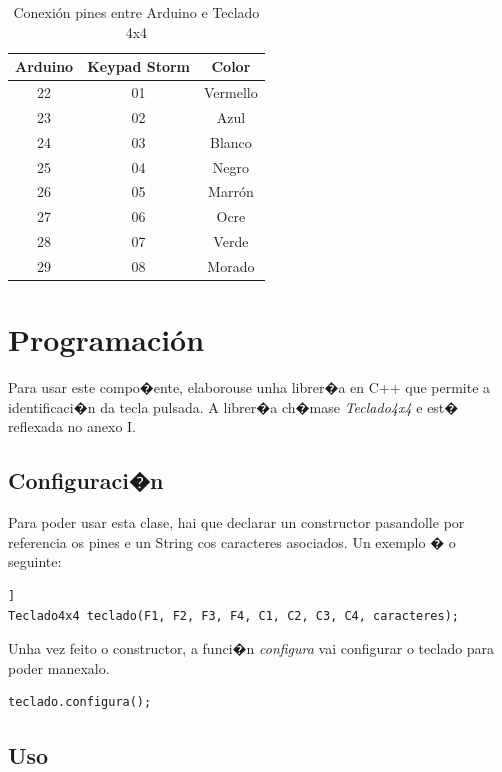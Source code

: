 \documentclass[11pt,twoside]{book}
\begin{document}
\begin{table}[htbt]
\begin{center}
\begin{tabular}{|c|c|c|}
\hline
Arduino & Keypad Storm & Color \\
\hline
22 & 01 & Vermello \\
\hline
23 & 02 & Azul\\
\hline
24 & 03 & Blanco \\
\hline
25 & 04 & Negro \\
\hline
26 & 05 & Marrón \\
\hline
27 & 06 & Ocre\\
\hline
28 & 07 & Verde \\
\hline
29 & 08 & Morado \\
\hline
\end{tabular}
\caption{Conexión pines entre Arduino e Teclado 4x4}
\label{TablaArduinoKeypad}
\end{center}
\end{table}



\section{Programación}

Para usar este compo�ente, elaborouse unha librer�a en C++ que permite a identificaci�n da tecla pulsada. A librer�a ch�mase \textit{Teclado4x4} e est� reflexada no anexo I.

\subsection{Configuraci�n}

Para poder usar esta clase, hai que declarar un constructor pasandolle por referencia os pines e un String cos caracteres asociados. Un exemplo � o seguinte:

\begin{lstlisting}] 
Teclado4x4 teclado(F1, F2, F3, F4, C1, C2, C3, C4, caracteres);
\end{lstlisting}

Unha vez feito o constructor, a funci�n \textit{configura} vai configurar o teclado para poder manexalo.

\begin{lstlisting}
teclado.configura();
\end{lstlisting}

\subsection{Uso}
\end{document}
